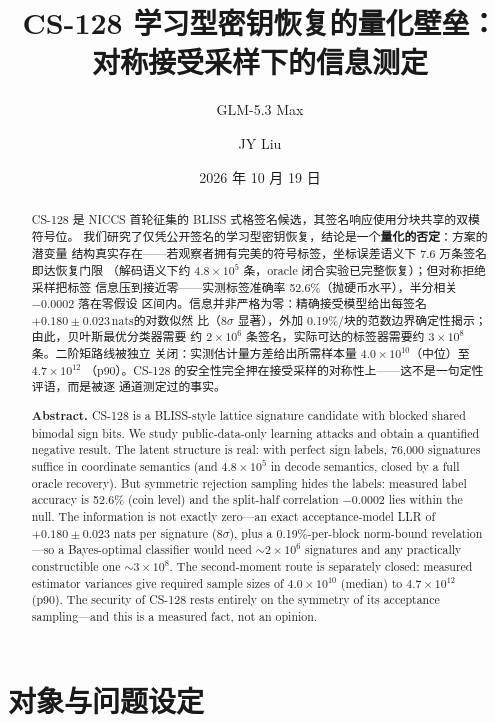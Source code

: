 \documentclass[UTF8,11pt,a4paper]{ctexart}
\title{\vspace{-1.2cm}\textbf{CS-128 学习型密钥恢复的量化壁垒：\\对称接受采样下的信息测定}}
\author{GLM-5.3 Max \and JY Liu}
\date{2026 年 10 月 19 日}
\newcommand{\nats}{\ensuremath{\,\mathrm{nats}}}
\begin{document}
\maketitle
\thispagestyle{fancy}

\begin{abstract}\noindent
CS-128 是 NICCS 首轮征集的 BLISS 式格签名候选，其签名响应使用分块共享的双模符号位。
我们研究了仅凭公开签名的学习型密钥恢复，结论是一个\textbf{量化的否定}：方案的潜变量
结构真实存在——若观察者拥有完美的符号标签，坐标误差语义下 7.6 万条签名即达恢复门限
（解码语义下约 $4.8\times10^5$ 条，oracle 闭合实验已完整恢复）；但对称拒绝采样把标签
信息压到接近零——实测标签准确率 52.6\%（抛硬币水平），半分相关 $-0.0002$ 落在零假设
区间内。信息并非严格为零：精确接受模型给出每签名 $+0.180 \pm 0.023$\nats 的对数似然
比（$8\sigma$ 显著），外加 0.19\%/块的范数边界确定性揭示；由此，贝叶斯最优分类器需要
约 $2\times10^6$ 条签名，实际可达的标签器需要约 $3\times10^8$ 条。二阶矩路线被独立
关闭：实测估计量方差给出所需样本量 $4.0\times10^{10}$（中位）至 $4.7\times10^{12}$
（p90）。CS-128 的安全性完全押在接受采样的对称性上——这不是一句定性评语，而是被逐
通道测定过的事实。

\medskip\noindent\textbf{Abstract.}
CS-128 is a BLISS-style lattice signature candidate with blocked shared bimodal
sign bits. We study public-data-only learning attacks and obtain a quantified
negative result. The latent structure is real: with perfect sign labels, 76,000
signatures suffice in coordinate semantics (and $4.8\times10^5$ in decode
semantics, closed by a full oracle recovery). But symmetric rejection sampling
hides the labels: measured label accuracy is 52.6\% (coin level) and the
split-half correlation $-0.0002$ lies within the null. The information is not
exactly zero---an exact acceptance-model LLR of $+0.180\pm0.023$ nats per
signature ($8\sigma$), plus a 0.19\%-per-block norm-bound revelation---so a
Bayes-optimal classifier would need ${\sim}2\times10^6$ signatures and any
practically constructible one ${\sim}3\times10^8$. The second-moment route is
separately closed: measured estimator variances give required sample sizes of
$4.0\times10^{10}$ (median) to $4.7\times10^{12}$ (p90). The security of CS-128
rests entirely on the symmetry of its acceptance sampling---and this is a
measured fact, not an opinion.
\end{abstract}

\section{对象与问题设定}
\end{document}
